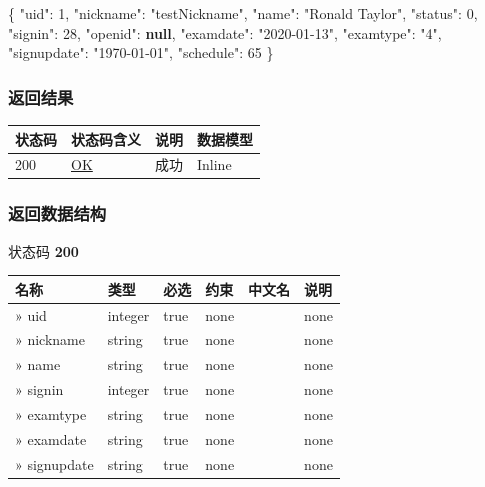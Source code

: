 \documentclass[
]{article}
\newenvironment{Shaded}{}{}
\newcommand{\DataTypeTok}[1]{\textcolor[rgb]{0.56,0.13,0.00}{#1}}
\newcommand{\DecValTok}[1]{\textcolor[rgb]{0.25,0.63,0.44}{#1}}
\newcommand{\FunctionTok}[1]{\textcolor[rgb]{0.02,0.16,0.49}{#1}}
\newcommand{\KeywordTok}[1]{\textcolor[rgb]{0.00,0.44,0.13}{\textbf{#1}}}
\newcommand{\StringTok}[1]{\textcolor[rgb]{0.25,0.44,0.63}{#1}}
\begin{document}
\begin{Shaded}
\begin{Highlighting}[]
\FunctionTok{\{}
  \DataTypeTok{"uid"}\FunctionTok{:} \DecValTok{1}\FunctionTok{,}
  \DataTypeTok{"nickname"}\FunctionTok{:} \StringTok{"testNickname"}\FunctionTok{,}
  \DataTypeTok{"name"}\FunctionTok{:} \StringTok{"Ronald Taylor"}\FunctionTok{,}
  \DataTypeTok{"status"}\FunctionTok{:} \DecValTok{0}\FunctionTok{,}
  \DataTypeTok{"signin"}\FunctionTok{:} \DecValTok{28}\FunctionTok{,}
  \DataTypeTok{"openid"}\FunctionTok{:} \KeywordTok{null}\FunctionTok{,}
  \DataTypeTok{"examdate"}\FunctionTok{:} \StringTok{"2020{-}01{-}13"}\FunctionTok{,}
  \DataTypeTok{"examtype"}\FunctionTok{:} \StringTok{"4"}\FunctionTok{,}
  \DataTypeTok{"signupdate"}\FunctionTok{:} \StringTok{"1970{-}01{-}01"}\FunctionTok{,}
  \DataTypeTok{"schedule"}\FunctionTok{:} \DecValTok{65}
\FunctionTok{\}}
\end{Highlighting}
\end{Shaded}

\hypertarget{ux8fd4ux56deux7ed3ux679c-39}{%
\subsubsection{返回结果}\label{ux8fd4ux56deux7ed3ux679c-39}}

\begin{longtable}[]{@{}llll@{}}
\toprule
状态码 & 状态码含义 & 说明 & 数据模型 \\
\midrule
\endhead
200 & \href{https://tools.ietf.org/html/rfc7231\#section-6.3.1}{OK} &
成功 & Inline \\
\bottomrule
\end{longtable}

\hypertarget{ux8fd4ux56deux6570ux636eux7ed3ux6784-31}{%
\subsubsection{返回数据结构}\label{ux8fd4ux56deux6570ux636eux7ed3ux6784-31}}

状态码 \textbf{200}

\begin{longtable}[]{@{}llllll@{}}
\toprule
名称 & 类型 & 必选 & 约束 & 中文名 & 说明 \\
\midrule
\endhead
» uid & integer & true & none & & none \\
» nickname & string & true & none & & none \\
» name & string & true & none & & none \\
» signin & integer & true & none & & none \\
» examtype & string & true & none & & none \\
» examdate & string & true & none & & none \\
» signupdate & string & true & none & & none \\
\bottomrule
\end{longtable}
\end{document}
